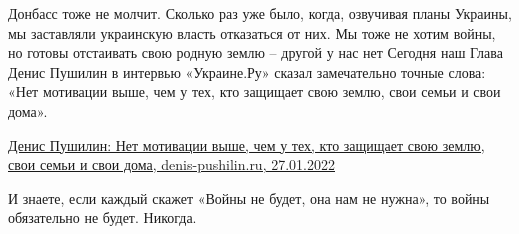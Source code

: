 Донбасс тоже не молчит. Сколько раз уже было, когда, озвучивая планы Украины,
мы заставляли украинскую власть отказаться от них. Мы тоже не хотим войны, но
готовы отстаивать свою родную землю – другой у нас нет Сегодня наш Глава Денис
Пушилин в интервью «Украине.Ру» сказал замечательно точные слова: «Нет
мотивации выше, чем у тех, кто защищает свою землю, свои семьи и свои дома».

\href{https://denis-pushilin.ru/press/denis-pushilin-net-motivatsii-vyshe-chem-u-teh-kto-zashhishhaet-svoyu-zemlyu-svoi-semi-i-svoi-doma/}{%
Денис Пушилин: Нет мотивации выше, чем у тех, кто защищает свою землю, свои семьи и свои дома, denis-pushilin.ru, 27.01.2022%
}

И знаете, если каждый скажет «Войны не будет, она нам не нужна», то войны
обязательно не будет. Никогда.

